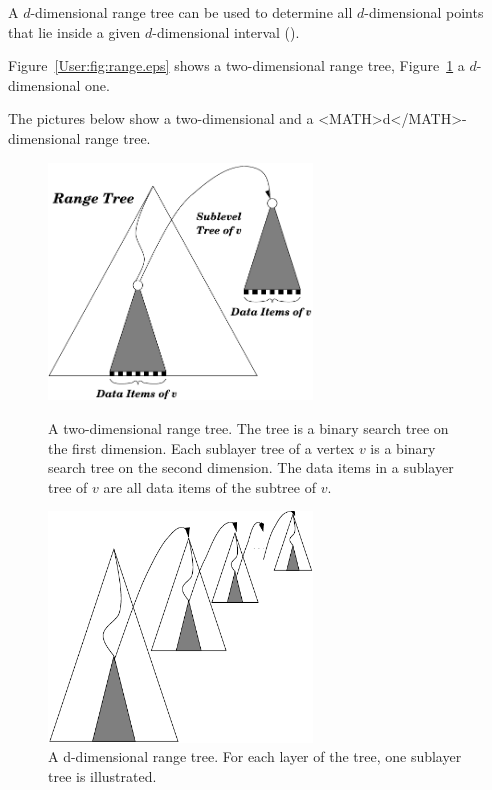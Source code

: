 A $d$-dimensional range tree can be used to determine all
$d$-dimensional points that lie inside  a given $d$-dimensional
interval ().
\begin{ccTexOnly}
Figure~\ref{User:fig:range.eps} shows a two-dimensional range tree,
Figure~\ref{User:fig:d-range.eps} a $d$-dimensional one.
\end{ccTexOnly}
\begin{ccHtmlOnly}
The pictures below show a two-dimensional and a <MATH>d</MATH>-dimensional
range tree.
\end{ccHtmlOnly}
\begin{ccTexOnly}
    \begin{figure}[htbp]
    \begin{minipage}{7cm}
    \begin{center}
    \includegraphics[width=7cm,clip]{SearchStructures/range2}
    \end{center}
    \caption{\label{User:fig:range.eps}A two-dimensional range tree. The
      tree is a binary search tree on the first dimension. Each
      sublayer tree of a vertex $v$ is a binary search tree on the second
      dimension. The data items in a sublayer tree of $v$ are
      all data items of the subtree of $v$.}
    \end{minipage}
    \hspace*{1em}
    \begin{minipage}{7cm}
    \begin{center}
    \includegraphics[width=7cm,clip]{SearchStructures/d-range}
    \end{center}
    \caption{\label{User:fig:d-range.eps}A d-dimensional range tree. For
      each layer of the tree, one
      sublayer tree is illustrated.}
    \vspace{2\baselineskip}
    \end{minipage}
    \end{figure}
\end{ccTexOnly}

